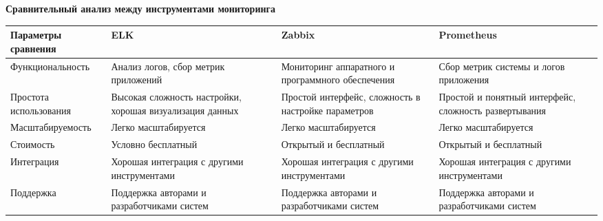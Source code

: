  \hypertarget{app-b}{\label{app-b}}

\begin{center}
    \textbf{Сравнительный анализ между инструментами мониторинга}
\end{center}
\vspace{\baselineskip}

\begingroup
\flushbottom
{} %
\small\begin{longtable}{|p{38mm}|p{34mm}|p{32mm}|p{33mm}|}
    \hline
    Параметры сравнения    & ELK                                                      & Zabbix                                              & Prometheus                                            \\ \hline
    Функциональность       & Анализ логов, сбор метрик приложений                     & Мониторинг аппаратного и программного обеспечения   & Сбор метрик системы и логов приложения                \\ \hline
    Простота использования & Высокая сложность настройки, хорошая визуализация данных & Простой интерфейс, сложность в настройке параметров & Простой и понятный интерфейс, сложность развертывания \\ \hline
    Масштабируемость       & Легко масштабируется                                     & Легко масштабируется                                & Легко масштабируется                                  \\ \hline
    Стоимость              & Условно бесплатный                                       & Открытый и бесплатный                               & Открытый и бесплатный                                 \\ \hline
    Интеграция             & Хорошая интеграция с другими инструментами               & Хорошая интеграция с другими инструментами          & Хорошая интеграция с другими инструментами            \\ \hline
    Поддержка              & Поддержка авторами и разработчиками систем               & Поддержка авторами и разработчиками систем          & Поддержка авторами и разработчиками систем            \\ \hline
\end{longtable}
\endgroup
\clearpage
